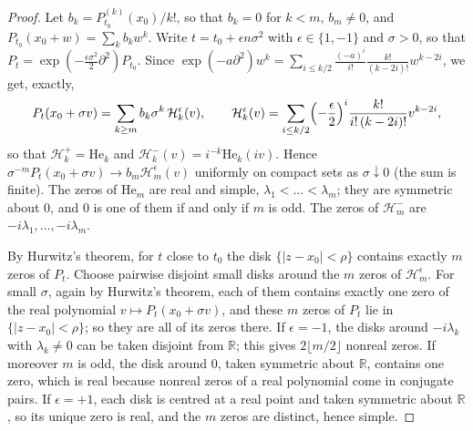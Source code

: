 \documentclass[11pt]{amsart}
\theoremstyle{definition}
\theoremstyle{remark}
\numberwithin{equation}{section}
\newcommand{\R}{\mathbb{R}}
\newcommand{\He}{\mathrm{He}}
\begin{document}
\begin{proof}
Let $b_k=P_{t_0}^{(k)}(x_0)/k!$, so that $b_k=0$ for $k<m$, $b_m\ne0$, and $P_{t_0}(x_0+w)=\sum_kb_kw^k$. Write $t=t_0+\epsilon n\sigma^2$ with $\epsilon\in\{1,-1\}$ and $\sigma>0$, so that $P_t=\exp(-\frac{\epsilon\sigma^2}2\partial^2)P_{t_0}$. Since $\exp(-a\partial^2)w^k=\sum_{i\le k/2}\frac{(-a)^i}{i!}\frac{k!}{(k-2i)!}w^{k-2i}$, we get, exactly,
\[
P_t(x_0+\sigma v)=\sum_{k\ge m}b_k\sigma^k\,\mathcal H_k^\epsilon(v),\qquad\mathcal H_k^{\epsilon}(v)=\sum_{i\le k/2}\Bigl(-\frac\epsilon2\Bigr)^i\frac{k!}{i!\,(k-2i)!}v^{k-2i},
\]
so that $\mathcal H_k^{+}=\He_k$ and $\mathcal H_k^{-}(v)=i^{-k}\He_k(iv)$. Hence $\sigma^{-m}P_t(x_0+\sigma v)\to b_m\mathcal H_m^\epsilon(v)$ uniformly on compact sets as $\sigma\downarrow0$ (the sum is finite). The zeros of $\He_m$ are real and simple, $\lambda_1<\dots<\lambda_m$; they are symmetric about $0$, and $0$ is one of them if and only if $m$ is odd. The zeros of $\mathcal H_m^-$ are $-i\lambda_1,\dots,-i\lambda_m$.

By Hurwitz's theorem, for $t$ close to $t_0$ the disk $\{|z-x_0|<\rho\}$ contains exactly $m$ zeros of $P_t$. Choose pairwise disjoint small disks around the $m$ zeros of $\mathcal H_m^\epsilon$. For small $\sigma$, again by Hurwitz's theorem, each of them contains exactly one zero of the real polynomial $v\mapsto P_t(x_0+\sigma v)$, and these $m$ zeros of $P_t$ lie in $\{|z-x_0|<\rho\}$; so they are all of its zeros there. If $\epsilon=-1$, the disks around $-i\lambda_k$ with $\lambda_k\ne0$ can be taken disjoint from $\R$; this gives $2\lfloor m/2\rfloor$ nonreal zeros. If moreover $m$ is odd, the disk around $0$, taken symmetric about $\R$, contains one zero, which is real because nonreal zeros of a real polynomial come in conjugate pairs. If $\epsilon=+1$, each disk is centred at a real point and taken symmetric about $\R$, so its unique zero is real, and the $m$ zeros are distinct, hence simple.
\end{proof}
\end{document}
